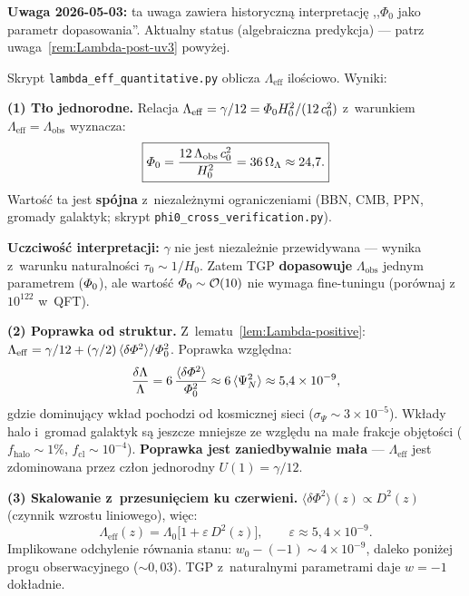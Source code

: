 \begin{remark}\label{rem:Lambda-quantitative}
\textbf{Uwaga 2026-05-03:} ta uwaga zawiera historyczn\k{a} interpretacj\k{e}
,,$\Phi_0$ jako parametr dopasowania''. Aktualny status (algebraiczna
predykcja) --- patrz uwaga~\ref{rem:Lambda-post-uv3} powy\.zej.

Skrypt \texttt{lambda\_eff\_quantitative.py} oblicza
$\Lambda_{\mathrm{eff}}$ ilo\'sciowo. Wyniki:

\medskip\noindent
\textbf{(1) T\l{}o jednorodne.}
Relacja $\Lambda_{\mathrm{eff}} = \gamma/12 = \varPhi_0 H_0^2/(12\,c_0^2)$
z~warunkiem $\Lambda_{\mathrm{eff}} = \Lambda_{\mathrm{obs}}$ wyznacza:
\begin{equation}\label{eq:Phi0-from-Lambda}
  \boxed{
    \varPhi_0 = \frac{12\,\Lambda_{\mathrm{obs}}\,c_0^2}{H_0^2}
    = 36\,\Omega_\Lambda
    \approx 24{,}7.
  }
\end{equation}
Warto\'s\'c ta jest \textbf{sp\'ojna} z~niezale\.znymi
ograniczeniami (BBN, CMB, PPN, gromady galaktyk;
skrypt \texttt{phi0\_cross\_verification.py}).

\medskip\noindent
\textbf{Uczciwo\'s\'c interpretacji:} $\gamma$ nie jest
niezale\.znie przewidywana --- wynika z~warunku naturalno\'sci
$\tau_0 \sim 1/H_0$. Zatem TGP \textbf{dopasowuje}
$\Lambda_{\mathrm{obs}}$ jednym parametrem ($\varPhi_0$),
ale warto\'s\'c $\varPhi_0 \sim \mathcal{O}(10)$ nie wymaga
fine-tuningu (por\'ownaj z~$10^{122}$ w~QFT).

\medskip\noindent
\textbf{(2) Poprawka od struktur.}
Z~lematu~\ref{lem:Lambda-positive}:
$\Lambda_{\mathrm{eff}} = \gamma/12 + (\gamma/2)\,
\langle\delta\varPhi^2\rangle/\varPhi_0^2$.
Poprawka wzgl\k{e}dna:
\[
  \frac{\delta\Lambda}{\Lambda}
  = 6\,\frac{\langle\delta\varPhi^2\rangle}{\varPhi_0^2}
  \approx 6\,\langle\Psi_N^2\rangle
  \approx 5{,}4 \times 10^{-9},
\]
gdzie dominuj\k{a}cy wk\l{}ad pochodzi od kosmicznej sieci
($\sigma_\Psi \sim 3 \times 10^{-5}$). Wk\l{}ady halo
i~gromad galaktyk s\k{a} jeszcze mniejsze ze wzgl\k{e}du
na ma\l{}e frakcje obj\k{e}to\'sci ($f_{\mathrm{halo}} \sim 1\%$,
$f_{\mathrm{cl}} \sim 10^{-4}$).
\textbf{Poprawka jest zaniedbywalnie ma\l{}a} ---
$\Lambda_{\mathrm{eff}}$ jest zdominowana przez cz\l{}on
jednorodny $U(1) = \gamma/12$.

\medskip\noindent
\textbf{(3) Skalowanie z~przesuni\k{e}ciem ku czerwieni.}
$\langle\delta\Phi^2\rangle(z) \propto D^2(z)$
(czynnik wzrostu liniowego), wi\k{e}c:
\[
  \Lambda_{\mathrm{eff}}(z)
  = \Lambda_0\bigl[1 + \varepsilon\,D^2(z)\bigr],
  \qquad
  \varepsilon \approx 5{,}4 \times 10^{-9}.
\]
Implikowane odchylenie r\'ownania stanu:
$w_0 - (-1) \sim 4 \times 10^{-9}$,
daleko poni\.zej progu obserwacyjnego ($\sim 0{,}03$).
TGP z~naturalnymi parametrami daje $w = -1$ dok\l{}adnie.


\end{remark}
